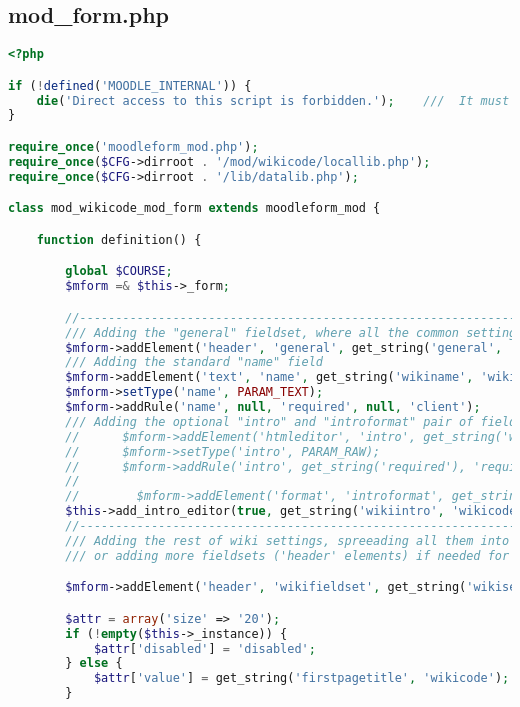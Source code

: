 \subsection{mod\_form.php}
\begin{lstlisting}[language=PHP]
<?php

if (!defined('MOODLE_INTERNAL')) {
    die('Direct access to this script is forbidden.');    ///  It must be included from a Moodle page
}

require_once('moodleform_mod.php');
require_once($CFG->dirroot . '/mod/wikicode/locallib.php');
require_once($CFG->dirroot . '/lib/datalib.php');

class mod_wikicode_mod_form extends moodleform_mod {

    function definition() {

        global $COURSE;
        $mform =& $this->_form;

        //-------------------------------------------------------------------------------
        /// Adding the "general" fieldset, where all the common settings are showed
        $mform->addElement('header', 'general', get_string('general', 'form'));
        /// Adding the standard "name" field
        $mform->addElement('text', 'name', get_string('wikiname', 'wikicode'), array('size' => '64'));
        $mform->setType('name', PARAM_TEXT);
        $mform->addRule('name', null, 'required', null, 'client');
        /// Adding the optional "intro" and "introformat" pair of fields
        //    	$mform->addElement('htmleditor', 'intro', get_string('wikiintro', 'wiki'));
        //		$mform->setType('intro', PARAM_RAW);
        //		$mform->addRule('intro', get_string('required'), 'required', null, 'client');
        //
        //        $mform->addElement('format', 'introformat', get_string('format'));
        $this->add_intro_editor(true, get_string('wikiintro', 'wikicode'));
        //-------------------------------------------------------------------------------
        /// Adding the rest of wiki settings, spreeading all them into this fieldset
        /// or adding more fieldsets ('header' elements) if needed for better logic

        $mform->addElement('header', 'wikifieldset', get_string('wikisettings', 'wikicode'));

        $attr = array('size' => '20');
        if (!empty($this->_instance)) {
            $attr['disabled'] = 'disabled';
        } else {
            $attr['value'] = get_string('firstpagetitle', 'wikicode');
        }


\end{lstlisting}
